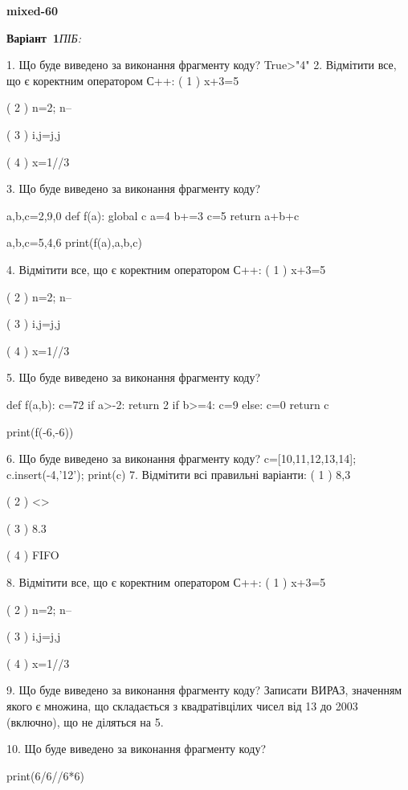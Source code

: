 \documentclass[11pt]{article}
\begin{document}
{\large\textbf{mixed-60}}

\textbf{Варіант \No\,1}\hfill \textit{ПІБ:}\,\underline{\hspace{60mm}}
\vspace{4mm}

1. Що буде виведено за виконання фрагменту коду?
True>"4"
2. Відмітити все, що є коректним оператором С++:
( 1 ) x+3=5

( 2 ) n=2; n--

( 3 ) i,j=j,j

( 4 ) x=1//3

3. Що буде виведено за виконання фрагменту коду?

a,b,c=2,9,0
def f(a):
global c    a=4
    b+=3
    c=5
    return a+b+c

a,b,c=5,4,6
print(f(a),a,b,c)

4. Відмітити все, що є коректним оператором С++:
( 1 ) x+3=5

( 2 ) n=2; n--

( 3 ) i,j=j,j

( 4 ) x=1//3

5. Що буде виведено за виконання фрагменту коду?

def f(a,b):
    c=72
    if a>-2:
        return 2
    if b>=4:
         c=9
    else: 
        c=0
    return c

print(f(-6,-6))

6. Що буде виведено за виконання фрагменту коду?
c=[10,11,12,13,14]; c.insert(-4,'12'); print(c)
7. Відмітити всі правильні варіанти:
( 1 ) 8,3

( 2 ) <>

( 3 ) 8.3

( 4 ) FIFO

8. Відмітити все, що є коректним оператором С++:
( 1 ) x+3=5

( 2 ) n=2; n--

( 3 ) i,j=j,j

( 4 ) x=1//3

9. Що буде виведено за виконання фрагменту коду?
Записати ВИРАЗ, значенням якого є множина, що складається з квадратівцілих чисел від 13 до 2003 (включно), що не діляться на 5.

10. Що буде виведено за виконання фрагменту коду?

print(6/6//6*6)
\end{document}
